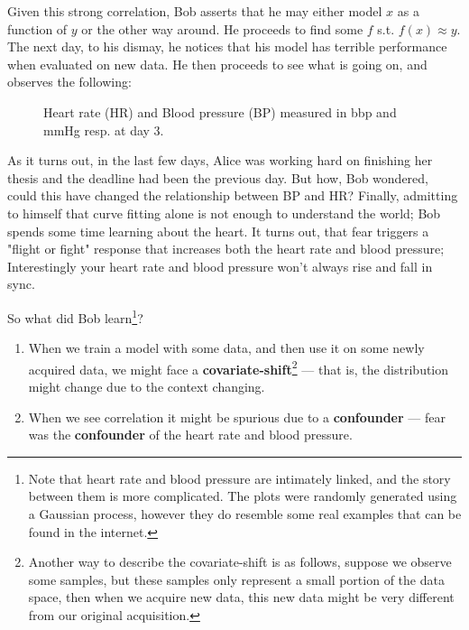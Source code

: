 Given this strong correlation, Bob asserts that he may either model $x$ as a function of $y$ or the other way 
around. He proceeds to find some $f$ s.t. $f(x) \approx y$. The next day, to his dismay, he notices that his
model has terrible performance when evaluated on new data. He then proceeds to see what is going on, and 
observes the following:

\begin{figure}[htb]
    \centering
    \caption{Heart rate (HR) and Blood pressure (BP) measured in bbp and mmHg resp. at day 3.}
\end{figure}

As it turns out, in the last few days, Alice was working hard on finishing her thesis and the deadline had been 
the previous day. But how, Bob wondered, could this have changed the relationship between BP and HR? 
Finally, admitting to himself that curve fitting alone is not enough to understand the world; 
Bob spends some time learning about the heart. It turns out, that fear triggers a "flight or fight"
response that increases both the heart rate and blood pressure; Interestingly your heart rate and blood pressure 
won’t always rise and fall in sync.

So what did Bob learn\footnote{
    Note that heart rate and blood pressure are intimately linked, and the story between them is more complicated.
    The plots were randomly generated using a Gaussian process, however they do resemble some real examples that 
    can be found in the internet.
}?

\begin{enumerate}
    \item When we train a model with some data, and then use it on some newly acquired data, we might
    face a \textbf{covariate-shift}\footnote{Another way to describe the covariate-shift is as follows, 
    suppose we observe some samples, but
    these samples only represent a small portion of the data space, then when we acquire new data, this new data might be very 
    different from our original acquisition. } --- that is, the distribution might change due to the context changing.
    \item When we see correlation it might be spurious due to a \textbf{confounder} --- fear was the \textbf{confounder} 
    of the heart rate and blood pressure.
\end{enumerate}


